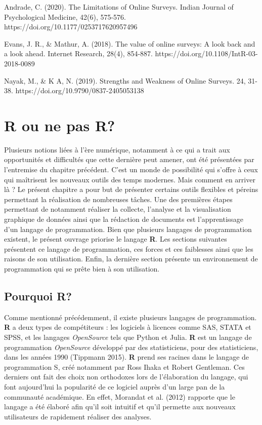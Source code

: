 \documentclass[
  letterpaper,
]{scrbook}
\begin{document}
Andrade, C. (2020). The Limitations of Online Surveys. Indian Journal of
Psychological Medicine, 42(6), 575-576.
https://doi.org/10.1177/0253717620957496

\hfill\break
Evans, J. R., \& Mathur, A. (2018). The value of online surveys: A look
back and a look ahead. Internet Research, 28(4), 854-887.
https://doi.org/10.1108/IntR-03-2018-0089

\hfill\break
Nayak, M., \& K A, N. (2019). Strengths and Weakness of Online Surveys.
24, 31-38. https://doi.org/10.9790/0837-2405053138


\hypertarget{sec-chap4}{%
\chapter{R ou ne pas R?}\label{sec-chap4}}

Plusieurs notions liées à l'ère numérique, notamment à ce qui a trait
aux opportunités et difficultés que cette dernière peut amener, ont été
présentées par l'entremise du chapitre précédent. C'est un monde de
possibilité qui s'offre à ceux qui maîtrisent les nouveaux outils des
temps modernes. Mais comment en arriver là ? Le présent chapitre a pour
but de présenter certains outils flexibles et péreins permettant la
réalisation de nombreuses tâches. Une des premières étapes permettant de
notamment réaliser la collecte, l'analyse et la visualisation graphique
de données ainsi que la rédaction de documents est l'apprentissage d'un
langage de programmation. Bien que plusieurs langages de programmation
existent, le présent ouvrage priorise le langage \textbf{R}. Les
sections suivantes présentent ce langage de programmation, ces forces et
ces faiblesses ainsi que les raisons de son utilisation. Enfin, la
dernière section présente un environnement de programmation qui se prête
bien à son utilisation.

\hypertarget{pourquoi-r}{%
\section{Pourquoi R?}\label{pourquoi-r}}

Comme mentionné précédemment, il existe plusieurs langages de
programmation. \textbf{R} a deux types de compétiteurs : les logiciels à
licences comme SAS, STATA et SPSS, et les langages \emph{OpenSource}
tels que Python et Julia. \textbf{R} est un langage de programmation
\emph{OpenSource} développé par des statisticiens, pour des
statisticiens, dans les années 1990 (Tippmann 2015). \textbf{R} prend
ses racines dans le langage de programmation S, créé notamment par Ross
Ihaka et Robert Gentleman. Ces derniers ont fait des choix non
orthodoxes lors de l'élaboration du langage, qui font aujourd'hui la
popularité de ce logiciel auprès d'un large pan de la communauté
académique. En effet, Morandat et al. (2012) rapporte que le langage a
été élaboré afin qu'il soit intuitif et qu'il permette aux nouveaux
utilisateurs de rapidement réaliser des analyses.
\end{document}
